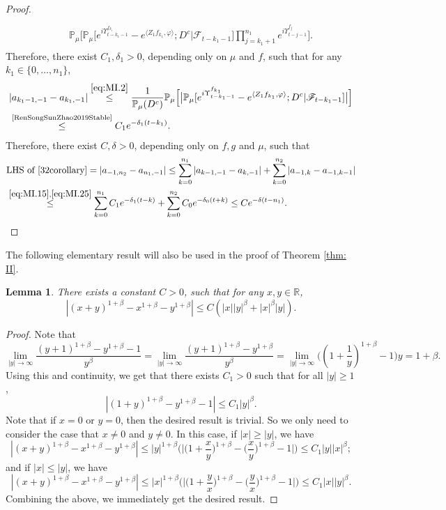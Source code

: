 \documentclass[12pt,a4paper]{amsart}
\theoremstyle{plain}
\newtheorem{lem}[thm]{Lemma}
\theoremstyle{definition}
\numberwithin{equation}{section}
\begin{document}
\begin{proof}
\begin{align}
\begin{multlined}
	\\ \qquad \mathbb{P}_{\mu}\Big[ \mathbb P_\mu\big[e^{i\Upsilon_{t-k_1-1}^{f_{k_1}}} -e^{\langle Z_1 f_{k_1}, \varphi\rangle}  ; D^c \big| \mathscr F_{t-k_1 - 1}\big] \prod_{j=k_1+1}^{n_1} e^{i\Upsilon_{t-j-1}^{f_j}} \Big] .
	\end{multlined}
	\end{align}
	Therefore,  there exist $C_1,\delta_1 >0$, depending only on $\mu$ and $f$,
	such that for any $k_1 \in \{0,\dots,n_1\}$,
\begin{align}
    &| a_{k_1-1,-1} - a_{k_1,-1}|
    \overset{\eqref{eq:MI.2}}\leq \frac{1}{\mathbb{P}_{\mu}(D^c)}\mathbb{P}_{\mu}\Big[\big|\mathbb P_\mu[e^{i\Upsilon^{f_{k_1}}_{t-k_1-1}}-e^{\langle Z_1f_{k_1}, \varphi\rangle}; D^c|\mathscr F_{t-k_1-1}]\big|\Big]
    \\&\label{eq:MI.25}\overset{\text{\cite[Proposition 3.5]{RenSongSunZhao2019Stable}}}\leq C_1 e^{-\delta_1 (t-k_1)}.
\end{align}
  Therefore, there exist $C,\delta >0$, depending only on $f,g$ and $\mu$, such that
  \begin{align}
    &\text{LHS of \eqref{32corollary}}
    = \left|a_{-1,n_2}-a_{n_1,-1}\right|
      \leq \sum_{k=0}^{n_1}\left|a_{k-1,-1}-a_{k,-1}\right|+\sum_{k=0}^{n_2}\left|a_{-1,k}-a_{-1,k-1}\right|\\
     & \overset{\eqref{eq:MI.15},\eqref{eq:MI.25}}\leq \sum_{k=0}^{n_1} C_1 e^{-\delta_1 (t-k)}+\sum_{k=0}^{n_2} C_0 e^{-\delta_0 (t+k)}
      \leq C e^{- \delta (t-n_1)}.
      \qedhere
  \end{align}
\end{proof}

The following elementary result will also be used in the proof of Theorem \ref{thm: II}.
\begin{lem}\label{ineq: analysis}
There exists a constant $C>0$, such that for any $x,y \in \mathbb R$,
\[
    |(x+y)^{1+\beta}-x^{1+\beta}-y^{1+\beta}|\leq C(|x||y|^{\beta}+|x|^{\beta}|y|).
\]
\end{lem}
\begin{proof}
   Note that
\[
  \lim_{|y|\rightarrow \infty}\frac{(y+1)^{1+\beta}-y^{1+\beta}-1}{y^{\beta}}=\lim_{|y|\rightarrow \infty}\frac{(y+1)^{1+\beta}-y^{1+\beta}}{y^{\beta}}=\lim_{|y|\rightarrow \infty}\big((1+\frac{1}{y})^{1+\beta}-1\big)y = 1+\beta.
\]
Using this and continuity, we get that there exists $C_1>0$ such that for all $|y|\geq 1$,
\[
  |(1+y)^{1+\beta}-y^{1+\beta}-1|\leq C_1 |y|^{\beta}.
\]
 Note that if $x = 0$ or $y= 0$, then the desired result is trivial.
So we only need to consider
 the case that $x \neq 0$ and $y \neq 0$.
 In this case, if $|x|\geq |y|$, we have
\[
|(x+y)^{1+\beta}-x^{1+\beta}-y^{1+\beta}|\leq |y|^{1+\beta}\bigg(\Big|\Big(1+\frac{x}{y}\Big)^{1+\beta}-\Big(\frac{x}{y}\Big)^{1+\beta}-1\Big|\bigg)\leq C_1|y||x|^{\beta};
\]
and  if $|x|\leq |y|$, we have
\[
	|(x+y)^{1+\beta}-x^{1+\beta}-y^{1+\beta}|
	\leq |x|^{1+\beta}\bigg( \Big| \Big(1+\frac{y}{x}\Big)^{1+\beta}-\Big(\frac{y}{x}\Big)^{1+\beta}-1\Big|\bigg)\leq C_1|x||y|^{\beta}.
\]
Combining the above, we immediately get the desired result.
\end{proof}
\end{document}
